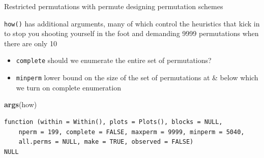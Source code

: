 \documentclass[10pt,ignorenonframetext,compress, aspectratio=169]{beamer}
\newenvironment{Shaded}{\begin{snugshade}}{\end{snugshade}}
\newcommand{\KeywordTok}[1]{\textcolor[rgb]{0.13,0.29,0.53}{\textbf{{#1}}}}
\newcommand{\NormalTok}[1]{{#1}}
\begin{document}
\begin{frame}[fragile]{Restricted permutations with permute \textbar{}
designing permutation schemes}

\texttt{how()} has additional arguments, many of which control the
heuristics that kick in to stop you shooting yourself in the foot and
demanding 9999 permutations when there are only 10

\begin{itemize}
\itemsep1pt\parskip0pt
\item
  \texttt{complete} should we enumerate the entire set of permutations?
\item
  \texttt{minperm} lower bound on the size of the set of permutations at
  \& below which we turn on complete enumeration
\end{itemize}

\scriptsize

\begin{Shaded}
\begin{Highlighting}[]
\KeywordTok{args}\NormalTok{(how)}
\end{Highlighting}
\end{Shaded}

\begin{verbatim}
function (within = Within(), plots = Plots(), blocks = NULL, 
    nperm = 199, complete = FALSE, maxperm = 9999, minperm = 5040, 
    all.perms = NULL, make = TRUE, observed = FALSE) 
NULL
\end{verbatim}

\normalsize

\end{frame}
\end{document}
